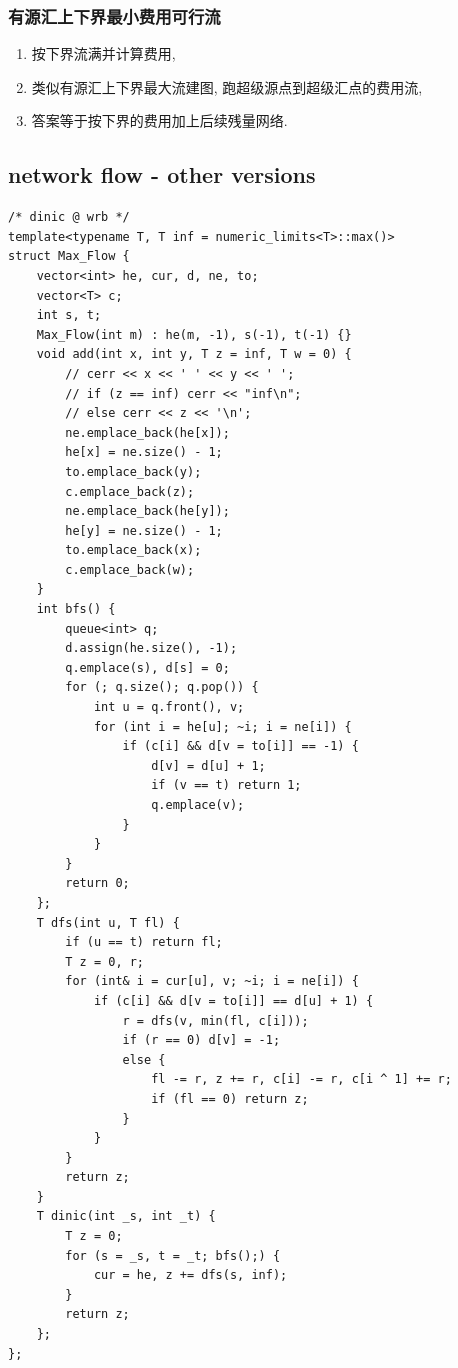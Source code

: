 \documentclass[UTF8, a4paper, titlepage, twoside]{ctexart}
\begin{document}
\subsubsection*{ 有源汇上下界最小费用可行流 }
\begin{enumerate}
    \item 按下界流满并计算费用,
    \item 类似有源汇上下界最大流建图, 跑超级源点到超级汇点的费用流,
    \item 答案等于按下界的费用加上后续残量网络.
\end{enumerate}

\subsection{ network flow - other versions }
\begin{lstlisting}[style=cpp]
/* dinic @ wrb */
template<typename T, T inf = numeric_limits<T>::max()>
struct Max_Flow {
	vector<int> he, cur, d, ne, to;
	vector<T> c;
	int s, t;
	Max_Flow(int m) : he(m, -1), s(-1), t(-1) {}
	void add(int x, int y, T z = inf, T w = 0) {
		// cerr << x << ' ' << y << ' ';
		// if (z == inf) cerr << "inf\n";
		// else cerr << z << '\n';
		ne.emplace_back(he[x]);
		he[x] = ne.size() - 1;
		to.emplace_back(y);
		c.emplace_back(z);
		ne.emplace_back(he[y]);
		he[y] = ne.size() - 1;
		to.emplace_back(x);
		c.emplace_back(w);
	}
	int bfs() {
		queue<int> q;
		d.assign(he.size(), -1);
		q.emplace(s), d[s] = 0;
		for (; q.size(); q.pop()) {
			int u = q.front(), v;
			for (int i = he[u]; ~i; i = ne[i]) {
				if (c[i] && d[v = to[i]] == -1) {
					d[v] = d[u] + 1;
					if (v == t) return 1;
					q.emplace(v);
				}
			}
		}
		return 0;
	};
	T dfs(int u, T fl) {
		if (u == t) return fl;
		T z = 0, r;
		for (int& i = cur[u], v; ~i; i = ne[i]) {
			if (c[i] && d[v = to[i]] == d[u] + 1) {
				r = dfs(v, min(fl, c[i]));
				if (r == 0) d[v] = -1;
				else {
					fl -= r, z += r, c[i] -= r, c[i ^ 1] += r;
					if (fl == 0) return z;
				}
			}
		}
		return z;
	}
	T dinic(int _s, int _t) {
		T z = 0;
		for (s = _s, t = _t; bfs();) {
			cur = he, z += dfs(s, inf);
		}
		return z;
	};
};
\end{lstlisting}
\end{document}
